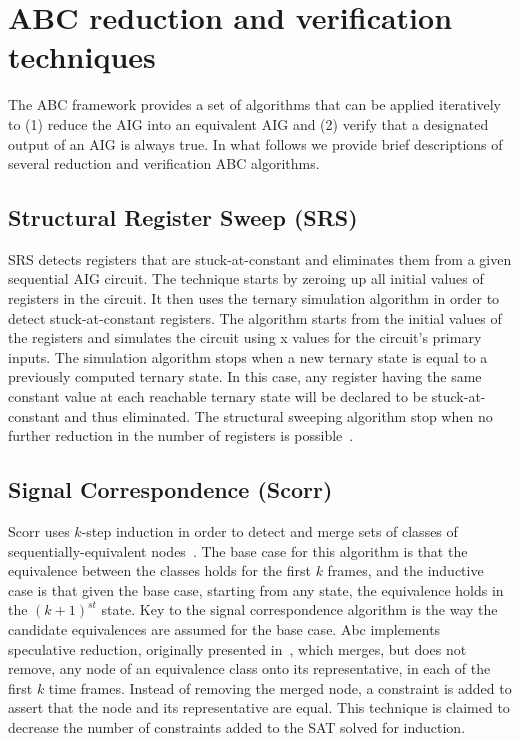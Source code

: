 \section{ABC reduction and verification techniques}
\label{app:abc}

The ABC framework provides a set of algorithms that can 
be applied iteratively to (1) reduce the AIG into 
an equivalent AIG and (2) verify that a designated 
output of an AIG is always true. 
In what follows we provide brief descriptions of several 
reduction and verification ABC algorithms. 

\subsection{Structural Register Sweep (SRS)}
SRS detects registers that are stuck-at-constant and eliminates 
them from a given sequential AIG circuit. The technique starts by zeroing up all 
initial values of registers in the circuit. It then uses the ternary simulation
algorithm in order to detect stuck-at-constant registers. The algorithm starts from 
the initial values of the registers and simulates the circuit using x values for the
circuit's primary inputs. The simulation algorithm stops when a new ternary state is 
equal to a previously computed ternary state. In this case, any register having the 
same constant value at each reachable ternary state will be declared to be 
stuck-at-constant and thus eliminated. The structural sweeping algorithm stop when 
no further reduction in the number of registers is possible~\cite{mishchenko2008scalable}. 

\subsection{Signal Correspondence (Scorr)} 
Scorr uses $k$-step induction in order to detect and merge sets of classes of 
sequentially-equivalent nodes~\cite{mishchenko2008scalable}. The base case for this algorithm is that the equivalence
between the classes holds for the first $k$ frames, and the inductive case is that 
given the base case, starting from any state, the equivalence holds in the 
$(k+1)^{st}$ state. Key to the signal correspondence algorithm is the way the candidate
equivalences are assumed for the base case. Abc implements speculative reduction, 
originally presented in~\cite{mony2005exploiting}, which merges, but does not remove, any node of an equivalence 
class onto its representative, in each of the first $k$ time frames. Instead of removing the 
merged node, a constraint is added to assert that the node and its representative are equal. 
This technique is claimed to decrease the number of constraints added to the SAT solved for 
induction. 


